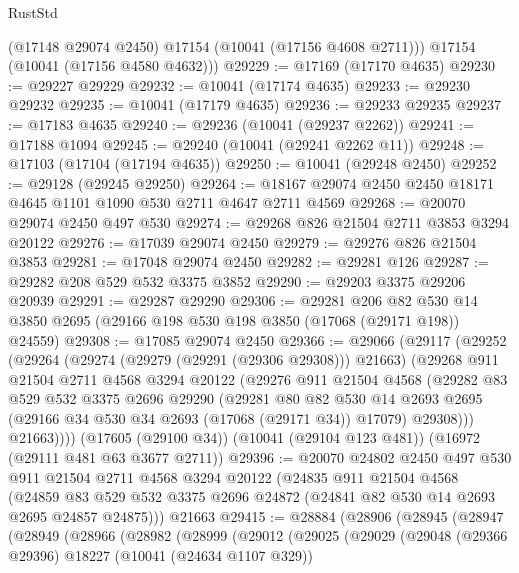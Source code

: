 \begin{lexlean}{RustStd}
\begin{coremodule}
        (@17148 @29074 @2450)
        @17154
        (@10041 (@17156 @4608 @2711)))
      @17154
      (@10041 (@17156 @4580 @4632)))
@29229 := @17169 (@17170 @4635)
@29230 := @29227 @29229
@29232 := @10041 (@17174 @4635)
@29233 := @29230 @29232
@29235 := @10041 (@17179 @4635)
@29236 := @29233 @29235
@29237 := @17183 @4635
@29240 := @29236 (@10041 (@29237 @2262))
@29241 := @17188 @1094
@29245 := @29240 (@10041 (@29241 @2262 @11))
@29248 := @17103 (@17104 (@17194 @4635))
@29250 := @10041 (@29248 @2450)
@29252 := @29128 (@29245 @29250)
@29264 := @18167 @29074 @2450 @2450 @18171 @4645 @1101 @1090 @530 @2711 @4647 @2711 @4569
@29268 := @20070 @29074 @2450 @497 @530
@29274 := @29268 @826 @21504 @2711 @3853 @3294 @20122
@29276 := @17039 @29074 @2450
@29279 := @29276 @826 @21504 @3853
@29281 := @17048 @29074 @2450
@29282 := @29281 @126
@29287 := @29282 @208 @529 @532 @3375 @3852
@29290 := @29203 @3375 @29206 @20939
@29291 := @29287 @29290
@29306 := @29281
    @206
    @82
    @530
    @14
    @3850
    @2695
    (@29166 @198 @530 @198 @3850 (@17068 (@29171 @198)) @24559)
@29308 := @17085 @29074 @2450
@29366 := @29066
    (@29117
      (@29252
        (@29264
          (@29274 (@29279 (@29291 (@29306 @29308))) @21663)
          (@29268
            @911
            @21504
            @2711
            @4568
            @3294
            @20122
            (@29276
              @911
              @21504
              @4568
              (@29282
                @83
                @529
                @532
                @3375
                @2696
                @29290
                (@29281
                  @80
                  @82
                  @530
                  @14
                  @2693
                  @2695
                  (@29166 @34 @530 @34 @2693 (@17068 (@29171 @34)) @17079)
                  @29308)))
            @21663))))
    (@17605 (@29100 @34))
    (@10041 (@29104 @123 @481))
    (@16972 (@29111 @481 @63 @3677 @2711))
@29396 := @20070
    @24802
    @2450
    @497
    @530
    @911
    @21504
    @2711
    @4568
    @3294
    @20122
    (@24835
      @911
      @21504
      @4568
      (@24859 @83 @529 @532 @3375 @2696 @24872 (@24841 @82 @530 @14 @2693 @2695 @24857 @24875)))
    @21663
@29415 := @28884
    (@28906
      (@28945
        (@28947
          (@28949
            (@28966
              (@28982
                (@28999
                  (@29012
                    (@29025
                      (@29029
                        (@29048
                          (@29366 @29396)
                          @18227
                          (@10041 (@24634 @1107 @329))

\end{coremodule}
\end{lexlean}
